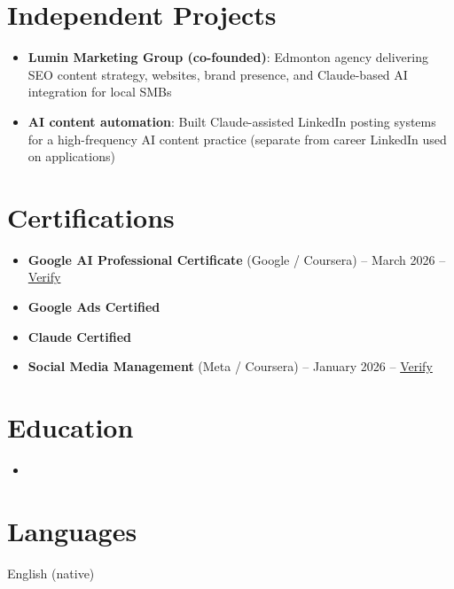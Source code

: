 \documentclass[11pt,a4paper,sans]{moderncv}
\begin{document}
\section{Independent Projects}
\vspace{1pt}
\begin{itemize}
\item \textbf{Lumin Marketing Group (co-founded)}: Edmonton agency delivering SEO content strategy, websites, brand presence, and Claude-based AI integration for local SMBs
\item \textbf{AI content automation}: Built Claude-assisted LinkedIn posting systems for a high-frequency AI content practice (separate from career LinkedIn used on applications)
\end{itemize}

\section{Certifications}
\vspace{1pt}
\begin{itemize}
\item \textbf{Google AI Professional Certificate} (Google / Coursera) -- March 2026 -- \href{https://www.coursera.org/account/accomplishments/verify/professional-cert/54E1P3RBHVL8}{Verify}
\item \textbf{Google Ads Certified}
\item \textbf{Claude Certified}
\item \textbf{Social Media Management} (Meta / Coursera) -- January 2026 -- \href{https://www.coursera.org/account/accomplishments/verify/7NOVGMU2L69G}{Verify}
\end{itemize}

\section{Education}
\vspace{1pt}
\begin{itemize}
\item{}
\end{itemize}

\section{Languages}
\vspace{1pt}
English (native)
\end{document}
